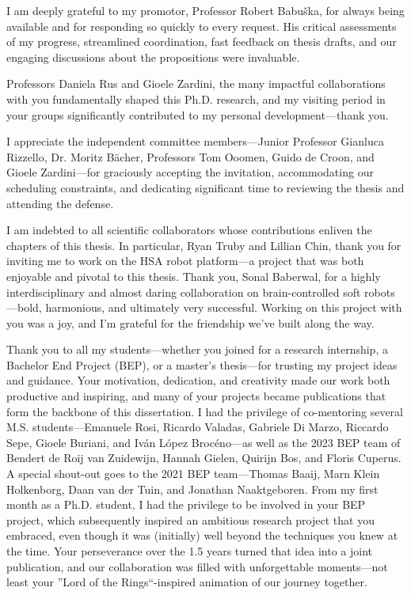I am deeply grateful to my promotor, Professor Robert Babu\v{s}ka, for always being available and for responding so quickly to every request. His critical assessments of my progress, streamlined coordination, fast feedback on thesis drafts, and our engaging discussions about the propositions were invaluable.

Professors Daniela Rus and Gioele Zardini, the many impactful collaborations with you fundamentally shaped this Ph.D. research, and my visiting period in your groups significantly contributed to my personal development—thank you.

I appreciate the independent committee members—Junior Professor Gianluca Rizzello, Dr. Moritz Bächer, Professors Tom Ooomen, Guido de Croon, and Gioele Zardini—for graciously accepting the invitation, accommodating our scheduling constraints, and dedicating significant time to reviewing the thesis and attending the defense.

I am indebted to all scientific collaborators whose contributions enliven the chapters of this thesis. In particular, Ryan Truby and Lillian Chin, thank you for inviting me to work on the HSA robot platform—a project that was both enjoyable and pivotal to this thesis.
Thank you, Sonal Baberwal, for a highly interdisciplinary and almost daring collaboration on brain-controlled soft robots—bold, harmonious, and ultimately very successful. Working on this project with you was a joy, and I’m grateful for the friendship we’ve built along the way.

Thank you to all my students—whether you joined for a research internship, a Bachelor End Project (BEP), or a master’s thesis—for trusting my project ideas and guidance. Your motivation, dedication, and creativity made our work both productive and inspiring, and many of your projects became publications that form the backbone of this dissertation.
I had the privilege of co-mentoring several M.S. students—Emanuele Rosi, Ricardo Valadas, Gabriele Di Marzo, Riccardo Sepe, Gioele Buriani, and Iván López Brocéno—as well as the 2023 BEP team of Bendert de Roij van Zuidewijn, Hannah Gielen, Quirijn Bos, and Floris Cuperus.
A special shout-out goes to the 2021 BEP team—Thomas Baaij, Marn Klein Holkenborg, Daan van der Tuin, and Jonathan Naaktgeboren. From my first month as a Ph.D. student, I had the privilege to be involved in your BEP project, which subsequently inspired an ambitious research project that you embraced, even though it was (initially) well beyond the techniques you knew at the time. Your perseverance over the 1.5 years turned that idea into a joint publication, and our collaboration was filled with unforgettable moments—not least your ''Lord of the Rings``-inspired animation of our journey together.

